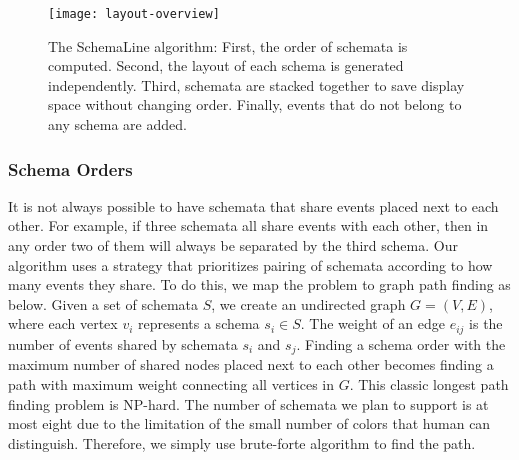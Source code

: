 \begin{figure}[ht]
\centering
\texttt{[image: layout-overview]}
\caption{The SchemaLine algorithm: First, the order of schemata is computed. Second, the layout of each schema is generated independently. Third, schemata are stacked together to save display space without changing order. Finally, events that do not belong to any schema are added.}
\label{fig:layout-overview}
\end{figure}

\subsubsection{Schema Orders}
\label{sub:layout-order}
It is not always possible to have schemata that share events placed next to each other. For example, if three schemata all share events with each other, then in any order two of them will always be separated by the third schema. Our algorithm uses a strategy that prioritizes pairing of schemata according to how many events they share. To do this, we map the problem to graph path finding as below. Given a set of schemata $S$, we create an undirected graph $G = (V,E)$, where each vertex $v_i$ represents a schema $s_i \in S$. The weight of an edge $e_{ij}$ is the number of events shared by schemata $s_i$ and $s_j$. Finding a schema order with the maximum number of shared nodes placed next to each other becomes finding a path with maximum weight connecting all vertices in $G$. This classic longest path finding problem is NP-hard. The number of schemata we plan to support is at most eight due to the limitation of the small number of colors that human can distinguish. Therefore, we simply use brute-forte algorithm to find the path.

%

